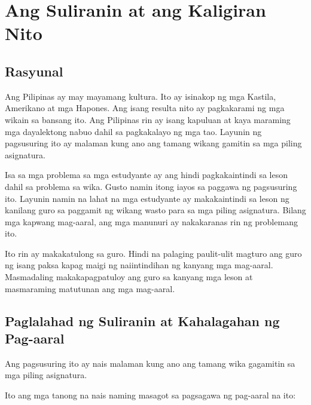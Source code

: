 \documentclass [parskip=full, 11pt] {scrreprt}
\begin{document}

\newcommand\discard[1]{}
\RedeclareSectionCommand[
  font=\normalfont\bfseries,
  tocentrynumberformat=\discard,
  beforeskip=0pt,
  afterskip=0pt]{chapter}
\RedeclareSectionCommand[
  font=\normalfont\bfseries,
  tocentrynumberformat=\discard,
  beforeskip=0pt,
  afterskip=1sp]{section} %
\tableofcontents
\parindent=0.5in
\renewcommand*{\chapterformat}{Kabanata \thechapter\enskip}
\pagebreak
\chapter {Ang Suliranin at ang Kaligiran Nito}
\section {Rasyunal}
Ang Pilipinas ay may mayamang kultura. Ito ay isinakop ng mga Kastila, Amerikano
at mga Hapones. Ang isang resulta nito ay pagkakarami ng mga wikain sa bansang
ito. Ang Pilipinas rin ay isang kapuluan at kaya maraming mga dayalektong nabuo
dahil sa pagkakalayo ng mga tao. Layunin ng pagsusuring ito ay malaman kung ano
ang tamang wikang gamitin sa mga piling asignatura.

Isa sa mga problema sa mga estudyante ay ang hindi pagkakaintindi sa leson dahil
sa problema sa wika. Gusto namin itong iayos sa paggawa ng pagsusuring ito.
Layunin namin na lahat na mga estudyante ay makakaintindi sa leson ng kanilang
guro sa paggamit ng wikang wasto para sa mga piling asignatura. Bilang mga
kapwang mag-aaral, ang mga manunuri ay nakakaranas rin ng problemang ito.

Ito rin ay makakatulong sa guro. Hindi na palaging paulit-ulit magturo ang guro
ng isang paksa kapag maigi ng naiintindihan ng kanyang mga mag-aaral.
Masmadaling makakapagpatuloy ang guro sa kanyang mga leson at masmaraming
matutunan ang mga mag-aaral.

\pagebreak
\section {Paglalahad ng Suliranin at Kahalagahan ng Pag-aaral}
Ang pagsusuring ito ay nais malaman kung ano ang tamang wika gagamitin sa mga
piling asignatura.

Ito ang mga tanong na nais naming masagot sa pagsagawa ng pag-aaral na ito:
\end{document}
